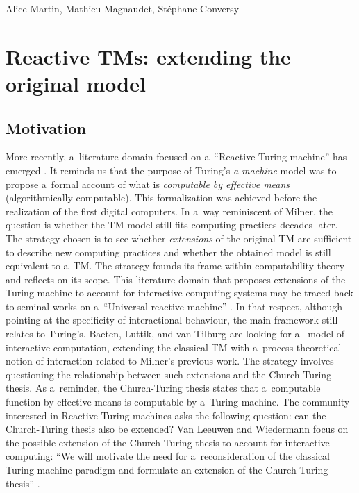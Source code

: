\begin{artengenv2auth}{Alice Martin, Mathieu Magnaudet, Stéphane Conversy}
\section{Reactive TMs: extending the original model}
\label{RTMS}
\subsection{Motivation}

More recently, a~literature domain focused on a~``Reactive Turing machine'' has emerged 
\parencite{Andersen1997, Baeten2012, Baeten2013, Luttik2016, VanLeeuwen2006}. It reminds us that the purpose of Turing's \textit{a-machine} model was to propose a~formal account of what is \textit{computable by effective means} (algorithmically computable). This formalization was achieved before the realization of the first digital computers. In a~way reminiscent of Milner, the question is whether the TM model still fits computing practices decades later. The strategy chosen is to see whether \textit{extensions} of the original TM are sufficient to describe new computing practices and whether the obtained model is still equivalent to a~TM. The strategy founds its frame within computability theory and reflects on its scope.
This literature domain that proposes extensions of the Turing machine to account for interactive computing systems may be traced back to seminal works on a~``Universal reactive machine'' \parencite{Andersen1997}. In that respect, although pointing at the specificity of interactional behaviour, the main framework still relates to Turing's. Baeten, Luttik, and van Tilburg \parencite{Baeten2013} are looking for a~ model of interactive computation, extending the classical TM with a~process-theoretical notion of interaction related to Milner's previous work. 
The strategy involves questioning the relationship between such extensions and the Church-Turing thesis. As a~reminder, the Church-Turing thesis states that a~computable function by effective means is computable by a~Turing machine. The community interested in Reactive Turing machines asks the following question: can the Church-Turing thesis also be extended? Van Leeuwen and Wiedermann \parencite*{VanLeeuwen2001} focus on the possible extension of the Church-Turing thesis to account for interactive computing: ``We will motivate the need for a~reconsideration of the classical Turing machine paradigm and formulate an extension of the Church-Turing thesis'' \parencite{VanLeeuwen2001}. 


\end{artengenv2auth}
